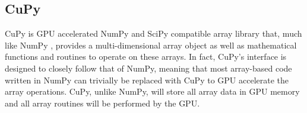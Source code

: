 \subsection{CuPy} \label{background:cupy}
CuPy is GPU accelerated NumPy \cite{numpy} and SciPy \cite{scipy} compatible array library that, much like NumPy \cite{numpy}, provides a multi-dimensional array object as well as mathematical functions and routines to operate on these arrays.
In fact, CuPy's interface is designed to closely follow that of NumPy, meaning that most array-based code written in NumPy can trivially be replaced with CuPy to GPU accelerate the array operations.
CuPy, unlike NumPy, will store all array data in GPU memory and all array routines will be performed by the GPU.
